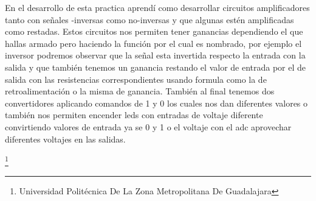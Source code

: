 \documentclass[10pt,a4paper]{article}
\begin{document}
En el desarrollo de esta practica aprendí como desarrollar circuitos amplificadores tanto con señales -inversas como no-inversas y que algunas estén amplificadas como restadas. Estos circuitos nos permiten tener ganancias dependiendo el que hallas armado pero haciendo la función por el cual es nombrado, por ejemplo el inversor podremos observar que la señal esta invertida respecto la entrada con la salida y que también tenemos un ganancia restando el valor de entrada por el de salida con las resistencias correspondientes usando formula como la de retroalimentación o la misma de ganancia. También al final tenemos dos convertidores aplicando comandos de 1 y 0 los cuales nos dan diferentes valores o también nos permiten encender leds con entradas de voltaje diferente convirtiendo valores de entrada ya se 0 y 1 o el voltaje con el adc aprovechar diferentes voltajes en las salidas.







\footnote{Universidad Politécnica De La Zona Metropolitana De Guadalajara} 
\end{document}
